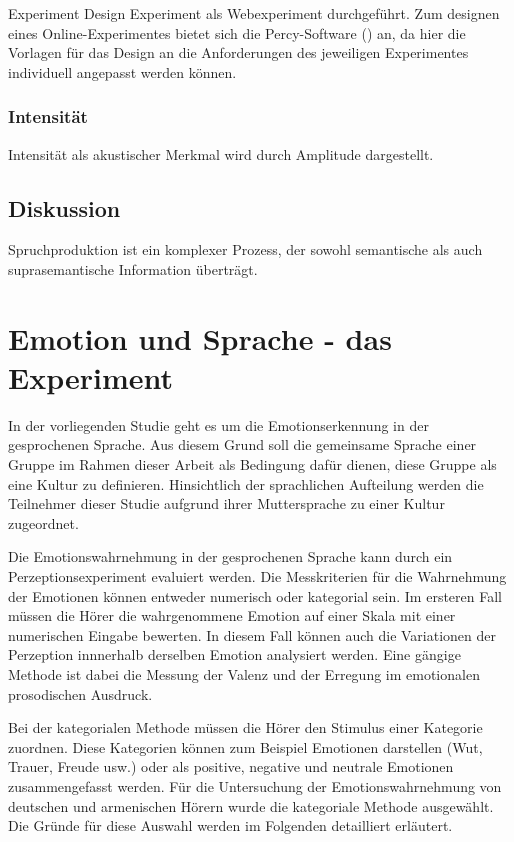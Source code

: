 \documentclass[11pt,a4paper,headsepline,twoside,toc=bibliography]{scrreprt}
\begin{document}
\bigskip

Experiment Design
Experiment als Webexperiment durchgeführt.
Zum designen eines Online-Experimentes bietet sich die Percy-Software (\cite{Draxler2011}) an, da hier die Vorlagen für das Design an die Anforderungen des jeweiligen Experimentes individuell angepasst werden können.


\subsection{Intensität}
\label{intensity}

Intensität als akustischer Merkmal wird durch Amplitude dargestellt. 



\section{Diskussion}
\label{sec:method_discussion}

Spruchproduktion ist ein komplexer Prozess, der sowohl semantische als auch suprasemantische Information überträgt. 



\chapter{Emotion und Sprache -  das Experiment}
\label{sec:experiment_overview}

In der vorliegenden Studie geht es um die Emotionserkennung in der gesprochenen Sprache. Aus diesem Grund soll die gemeinsame Sprache einer Gruppe im Rahmen dieser Arbeit als Bedingung dafür dienen, diese Gruppe als eine Kultur zu definieren. Hinsichtlich der sprachlichen Aufteilung werden die Teilnehmer dieser Studie aufgrund ihrer Muttersprache zu einer Kultur zugeordnet.  

Die Emotionswahrnehmung in der gesprochenen Sprache kann durch ein Perzeptionsexperiment evaluiert werden. Die Messkriterien für die Wahrnehmung der Emotionen können entweder numerisch oder kategorial sein. Im ersteren Fall müssen die Hörer die wahrgenommene Emotion auf einer Skala mit einer numerischen Eingabe bewerten. In diesem Fall können auch die Variationen der Perzeption innnerhalb derselben Emotion analysiert werden. Eine gängige Methode ist dabei die Messung der Valenz und der Erregung im emotionalen prosodischen Ausdruck. 

Bei der kategorialen Methode müssen die Hörer den Stimulus einer Kategorie zuordnen. Diese Kategorien können zum Beispiel Emotionen darstellen (Wut, Trauer, Freude usw.) oder als positive, negative und neutrale Emotionen zusammengefasst werden. Für die Untersuchung der Emotionswahrnehmung von deutschen und armenischen Hörern wurde die kategoriale Methode ausgewählt. Die Gründe für diese Auswahl werden im Folgenden detailliert erläutert.
\end{document}
